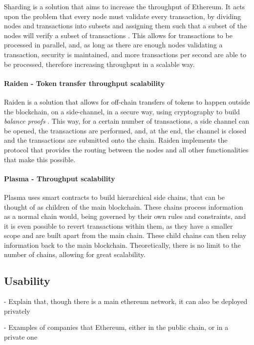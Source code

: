 Sharding is a solution that aims to increase the throughput of Ethereum. It acts upon the problem that every node must validate every transaction, by dividing nodes and transactions into subsets and assigning them such that a subset of the nodes will verify a subset of transactions \cite{ButerinSharding}. This allows for transactions to be processed in parallel, and, as long as there are enough nodes validating a transaction, security is maintained, and more transactions per second are able to be processed, therefore increasing throughput in a scalable way.

\paragraph{Raiden - Token transfer throughput scalability}
Raiden is a solution that allows for off-chain transfers of tokens to happen outside the blockchain, on a side-channel, in a secure way, using cryptography to build \textit{balance proofs} \cite{Hees}. This way, for a certain number of transactions, a side channel can be opened, the transactions are performed, and, at the end, the channel is closed and the transactions are submitted onto the chain. Raiden implements the protocol that provides the routing between the nodes and all other functionalities that make this possible.

\paragraph{Plasma - Throughput scalability}
Plasma uses smart contracts to build hierarchical side chains, that can be thought of as children of the main blockchain. These chains process information as a normal chain would, being governed by their own rules and constraints, and it is even possible to revert transactions within them, as they have a smaller scope and are built apart from the main chain. These child chains can then relay information back to the main blockchain. Theoretically, there is no limit to the number of chains, allowing for great scalability. \cite{Poon2017}

\break


\iffalse
\subsection{Usability}
- Explain that, though there is a main ethereum network, it can also be deployed privately

- Examples of companies that Ethereum, either in the public chain, or in a private one

